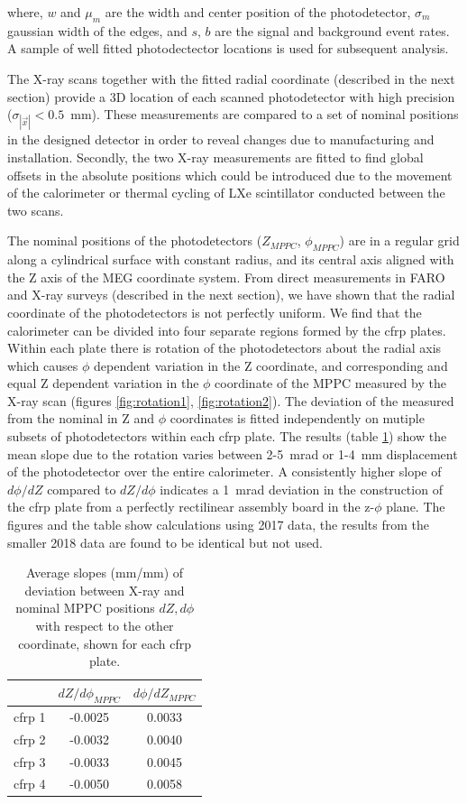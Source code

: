 \noindent where, $w$ and $\mu_m$ are the width and center position of
the photodetector, $\sigma_m$ gaussian width of the edges, and $s,\,b$
are the signal and background event rates. A sample of well fitted
photodectector locations is used for  subsequent analysis.

The X-ray scans together with the fitted radial coordinate (described
in the next section) provide a 3D
location of each scanned photodetector  with high precision
($\sigma_{|\vec{x}|}<0.5$~mm).  These measurements are compared to a set of
nominal positions in the designed detector in order to reveal changes due to
manufacturing and installation.  Secondly, the two X-ray  measurements are
fitted to find global offsets in the absolute positions which could be
introduced due to the movement of the calorimeter or thermal cycling of LXe
scintillator conducted between the two scans.

The nominal positions of the photodetectors ($Z_{MPPC}$,
$\phi_{MPPC}$) are in a regular grid along a cylindrical surface with
constant radius, and its central axis aligned with the Z axis of the
MEG coordinate system.  From direct measurements in FARO and X-ray
surveys (described in the next section), we have shown  that the
radial coordinate of the photodetectors is not perfectly uniform.  We
find that the calorimeter can be divided into four separate regions
formed by the cfrp plates. Within each plate there is rotation of the
photodetectors about the radial axis which causes $\phi$ dependent
variation in the Z coordinate, and corresponding and equal Z dependent
variation in the $\phi$ coordinate of the MPPC measured by the X-ray
scan (figures \ref{fig:rotation1}, \ref{fig:rotation2}). The deviation of the measured from
the nominal in Z and $\phi$ coordinates is fitted independently on
mutiple subsets of photodetectors within each cfrp plate. The results
(table \ref{tab:rotation}) show the mean slope due to the rotation
varies between 2-5~mrad  or 1-4~mm displacement of the photodetector
over the entire calorimeter.
A consistently higher slope of  $d\phi/dZ$ compared to $dZ/d\phi$
indicates a 1~mrad deviation in the construction of the cfrp plate
from a perfectly 
rectilinear assembly board in the z-$\phi$ plane.  The figures and the
table show calculations using 2017 data, the results from the smaller
2018 data are found to be identical but not used. 

\begin{table}
\begin{tabular}{ccc}
   & $dZ/d\phi_{MPPC}$ & $d\phi/dZ_{MPPC}$ \\
\hline 
cfrp 1 & -0.0025 & 0.0033 \\
cfrp 2 & -0.0032 & 0.0040 \\
cfrp 3 & -0.0033 & 0.0045 \\
cfrp 4 & -0.0050 & 0.0058 \\
\end{tabular}
\caption{Average slopes (mm/mm) of deviation between X-ray and nominal MPPC positions
$dZ, d\phi$ with respect to the other coordinate, shown for each 
cfrp plate.}
\label{tab:rotation}
\end{table}


